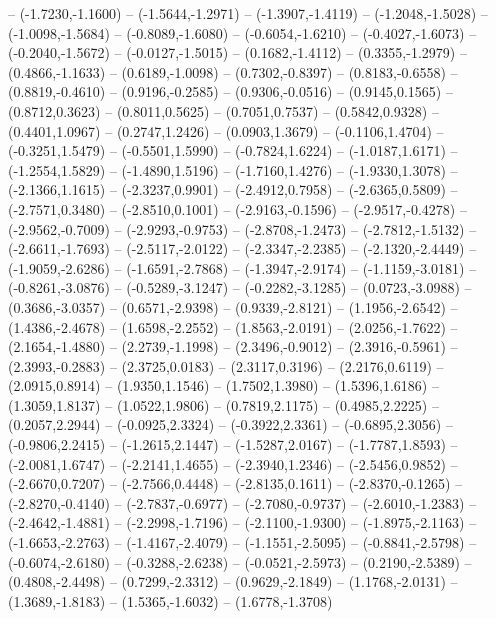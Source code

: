{	-- (-1.7230,-1.1600)
	-- (-1.5644,-1.2971)
	-- (-1.3907,-1.4119)
	-- (-1.2048,-1.5028)
	-- (-1.0098,-1.5684)
	-- (-0.8089,-1.6080)
	-- (-0.6054,-1.6210)
	-- (-0.4027,-1.6073)
	-- (-0.2040,-1.5672)
	-- (-0.0127,-1.5015)
	-- (0.1682,-1.4112)
	-- (0.3355,-1.2979)
	-- (0.4866,-1.1633)
	-- (0.6189,-1.0098)
	-- (0.7302,-0.8397)
	-- (0.8183,-0.6558)
	-- (0.8819,-0.4610)
	-- (0.9196,-0.2585)
	-- (0.9306,-0.0516)
	-- (0.9145,0.1565)
	-- (0.8712,0.3623)
	-- (0.8011,0.5625)
	-- (0.7051,0.7537)
	-- (0.5842,0.9328)
	-- (0.4401,1.0967)
	-- (0.2747,1.2426)
	-- (0.0903,1.3679)
	-- (-0.1106,1.4704)
	-- (-0.3251,1.5479)
	-- (-0.5501,1.5990)
	-- (-0.7824,1.6224)
	-- (-1.0187,1.6171)
	-- (-1.2554,1.5829)
	-- (-1.4890,1.5196)
	-- (-1.7160,1.4276)
	-- (-1.9330,1.3078)
	-- (-2.1366,1.1615)
	-- (-2.3237,0.9901)
	-- (-2.4912,0.7958)
	-- (-2.6365,0.5809)
	-- (-2.7571,0.3480)
	-- (-2.8510,0.1001)
	-- (-2.9163,-0.1596)
	-- (-2.9517,-0.4278)
	-- (-2.9562,-0.7009)
	-- (-2.9293,-0.9753)
	-- (-2.8708,-1.2473)
	-- (-2.7812,-1.5132)
	-- (-2.6611,-1.7693)
	-- (-2.5117,-2.0122)
	-- (-2.3347,-2.2385)
	-- (-2.1320,-2.4449)
	-- (-1.9059,-2.6286)
	-- (-1.6591,-2.7868)
	-- (-1.3947,-2.9174)
	-- (-1.1159,-3.0181)
	-- (-0.8261,-3.0876)
	-- (-0.5289,-3.1247)
	-- (-0.2282,-3.1285)
	-- (0.0723,-3.0988)
	-- (0.3686,-3.0357)
	-- (0.6571,-2.9398)
	-- (0.9339,-2.8121)
	-- (1.1956,-2.6542)
	-- (1.4386,-2.4678)
	-- (1.6598,-2.2552)
	-- (1.8563,-2.0191)
	-- (2.0256,-1.7622)
	-- (2.1654,-1.4880)
	-- (2.2739,-1.1998)
	-- (2.3496,-0.9012)
	-- (2.3916,-0.5961)
	-- (2.3993,-0.2883)
	-- (2.3725,0.0183)
	-- (2.3117,0.3196)
	-- (2.2176,0.6119)
	-- (2.0915,0.8914)
	-- (1.9350,1.1546)
	-- (1.7502,1.3980)
	-- (1.5396,1.6186)
	-- (1.3059,1.8137)
	-- (1.0522,1.9806)
	-- (0.7819,2.1175)
	-- (0.4985,2.2225)
	-- (0.2057,2.2944)
	-- (-0.0925,2.3324)
	-- (-0.3922,2.3361)
	-- (-0.6895,2.3056)
	-- (-0.9806,2.2415)
	-- (-1.2615,2.1447)
	-- (-1.5287,2.0167)
	-- (-1.7787,1.8593)
	-- (-2.0081,1.6747)
	-- (-2.2141,1.4655)
	-- (-2.3940,1.2346)
	-- (-2.5456,0.9852)
	-- (-2.6670,0.7207)
	-- (-2.7566,0.4448)
	-- (-2.8135,0.1611)
	-- (-2.8370,-0.1265)
	-- (-2.8270,-0.4140)
	-- (-2.7837,-0.6977)
	-- (-2.7080,-0.9737)
	-- (-2.6010,-1.2383)
	-- (-2.4642,-1.4881)
	-- (-2.2998,-1.7196)
	-- (-2.1100,-1.9300)
	-- (-1.8975,-2.1163)
	-- (-1.6653,-2.2763)
	-- (-1.4167,-2.4079)
	-- (-1.1551,-2.5095)
	-- (-0.8841,-2.5798)
	-- (-0.6074,-2.6180)
	-- (-0.3288,-2.6238)
	-- (-0.0521,-2.5973)
	-- (0.2190,-2.5389)
	-- (0.4808,-2.4498)
	-- (0.7299,-2.3312)
	-- (0.9629,-2.1849)
	-- (1.1768,-2.0131)
	-- (1.3689,-1.8183)
	-- (1.5365,-1.6032)
	-- (1.6778,-1.3708)
}
